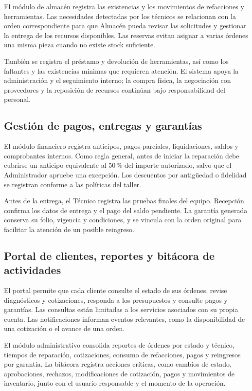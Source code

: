 El módulo de almacén registra las existencias y los movimientos de refacciones y herramientas. Las necesidades detectadas por los técnicos se relacionan con la orden correspondiente para que Almacén pueda revisar las solicitudes y gestionar la entrega de los recursos disponibles. Las reservas evitan asignar a varias órdenes una misma pieza cuando no existe stock suficiente.

También se registra el préstamo y devolución de herramientas, así como los faltantes y las existencias mínimas que requieren atención. El sistema apoya la administración y el seguimiento interno; la compra física, la negociación con proveedores y la reposición de recursos continúan bajo responsabilidad del personal.

\subsection{Gestión de pagos, entregas y garantías}

El módulo financiero registra anticipos, pagos parciales, liquidaciones, saldos y comprobantes internos. Como regla general, antes de iniciar la reparación debe cubrirse un anticipo equivalente al 50\,\% del importe autorizado, salvo que el Administrador apruebe una excepción. Los descuentos por antigüedad o fidelidad se registran conforme a las políticas del taller.

Antes de la entrega, el Técnico registra las pruebas finales del equipo. Recepción confirma los datos de entrega y el pago del saldo pendiente. La garantía generada conserva su folio, vigencia y condiciones, y se vincula con la orden original para facilitar la atención de un posible reingreso.

\subsection{Portal de clientes, reportes y bitácora de actividades}

El portal permite que cada cliente consulte el estado de sus órdenes, revise diagnósticos y cotizaciones, responda a los presupuestos y consulte pagos y garantías. Las consultas están limitadas a los servicios asociados con su propia cuenta. Las notificaciones informan eventos relevantes, como la disponibilidad de una cotización o el avance de una orden.

El módulo administrativo consolida reportes de órdenes por estado y técnico, tiempos de reparación, cotizaciones, consumo de refacciones, pagos y reingresos por garantía. La bitácora registra acciones críticas, como cambios de estado, aprobaciones, rechazos, modificaciones de cotización, pagos y movimientos de inventario, junto con el usuario responsable y el momento de la operación.

